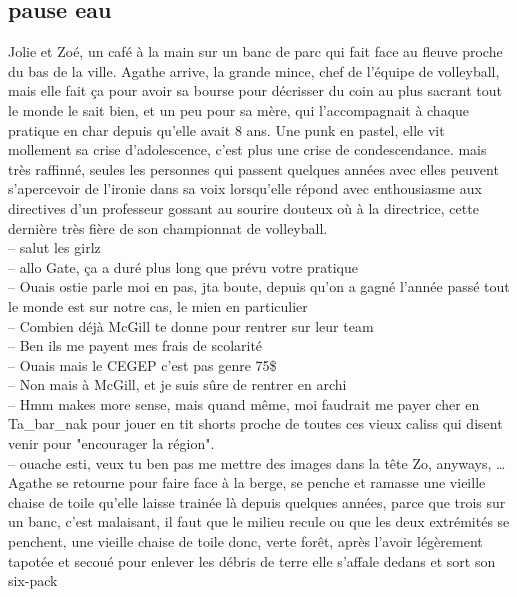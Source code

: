 \documentclass{article}
\begin{document}
\clearpage

\subsection{pause eau}

Jolie et Zoé, un café à la main sur un banc de parc qui fait face au fleuve
proche du bas de la ville. Agathe arrive, la grande mince, chef de l'équipe
de volleyball, mais elle fait ça pour avoir sa bourse pour décrisser du coin
au plus sacrant tout le monde le sait bien, et un peu pour sa mère, qui
l'accompagnait à chaque pratique en char depuis qu'elle avait 8 ans. Une punk
en pastel, elle vit mollement sa crise d'adolescence, c'est plus une crise
de condescendance. mais très raffinné, seules les personnes qui passent
quelques années avec elles peuvent s'apercevoir de l'ironie dans sa voix
lorsqu'elle répond avec enthousiasme  aux directives d'un professeur gossant
au sourire douteux où à la directrice, cette dernière très fière de son
championnat de volleyball.\\[1ex]

-- salut les girlz\\
-- allo Gate, ça a duré plus long que prévu votre pratique\\
-- Ouais ostie parle moi en pas, jta boute, depuis qu'on a gagné
l'année passé tout le monde est sur notre cas, le mien en particulier\\
-- Combien déjà McGill te donne pour rentrer sur leur team \\
-- Ben ils me payent mes frais de scolarité\\
-- Ouais mais le CEGEP c'est pas genre 75\$\\
-- Non mais à McGill, et je suis sûre de rentrer en archi\\
-- Hmm makes more sense, mais quand même, moi faudrait me payer
cher en Ta\_bar\_nak pour jouer en tit shorts proche de toutes ces vieux caliss
qui disent venir pour "encourager la région". \\
-- ouache esti, veux tu ben pas me mettre des images dans la tête Zo,
anyways, \ldots \\[1ex]
Agathe se retourne pour faire face à la berge, se penche et ramasse une
vieille chaise de toile qu'elle laisse trainée là depuis quelques années,
parce que trois sur un banc, c'est malaisant, il faut que le milieu recule
ou que les deux extrémités se penchent, une vieille chaise de toile donc,
verte forêt, après l'avoir légèrement tapotée et secoué pour enlever les débris
de terre elle s'affale dedans et sort son six-pack
\end{document}
